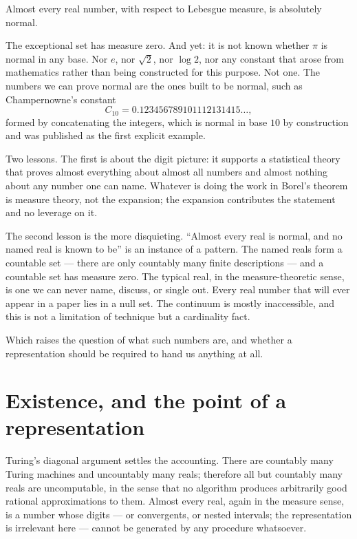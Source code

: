 \documentclass{essay}
\begin{document}
\begin{theorem}[Borel, 1909]
  Almost every real number, with respect to Lebesgue measure, is absolutely
  normal.
\end{theorem}

The exceptional set has measure zero. And yet: it is not known whether \(\pi\) is
normal in any base. Nor \(e\), nor \(\sqrt{2}\), nor \(\log 2\), nor any constant that
arose from mathematics rather than being constructed for this purpose. Not one.
The numbers we can prove normal are the ones built to be normal, such as
Champernowne's constant
\[ C_{10} = 0.123456789101112131415\ldots, \]
formed by concatenating the integers, which is normal in base \(10\) by
construction and was published as the first explicit example.

Two lessons. The first is about the digit picture: it supports a statistical
theory that proves almost everything about almost all numbers and almost
nothing about any number one can name. Whatever is doing the work in Borel's
theorem is measure theory, not the expansion; the expansion contributes the
statement and no leverage on it.

The second lesson is the more disquieting. ``Almost every real is normal, and no
named real is known to be'' is an instance of a pattern. The named reals form a
countable set --- there are only countably many finite descriptions --- and a
countable set has measure zero. The typical real, in the measure-theoretic
sense, is one we can never name, discuss, or single out. Every real number that
will ever appear in a paper lies in a null set. The continuum is mostly
inaccessible, and this is not a limitation of technique but a cardinality fact.

Which raises the question of what such numbers are, and whether a representation
should be required to hand us anything at all.

\section{Existence, and the point of a representation}

Turing's diagonal argument settles the accounting. There are countably many
Turing machines and uncountably many reals; therefore all but countably many
reals are uncomputable, in the sense that no algorithm produces arbitrarily good
rational approximations to them. Almost every real, again in the measure sense,
is a number whose digits --- or convergents, or nested intervals; the
representation is irrelevant here --- cannot be generated by any procedure
whatsoever.
\end{document}
